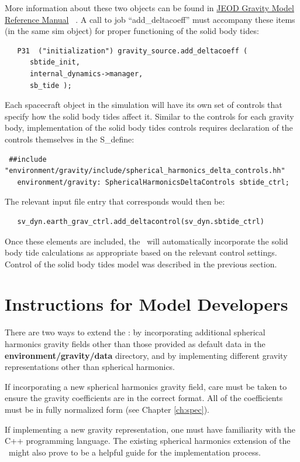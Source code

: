 More information about these two objects can be found in
\hyperref{file:refman.pdf}{}{}
{JEOD Gravity Model Reference Manual} ~\cite{gravity_refman}. A call to job
``add\_deltacoeff'' must accompany these items (in the same sim object) for
proper functioning of the solid body tides:
\begin{verbatim}
   P31  ("initialization") gravity_source.add_deltacoeff (
      sbtide_init,
      internal_dynamics->manager,
      sb_tide );
\end{verbatim}

Each spacecraft object in the simulation will have its own set of controls that
specify how the solid body tides affect it. Similar to the controls for each
gravity body, implementation of the solid body tides controls requires
declaration of the controls themselves in the S\_define:
\begin{verbatim}
 ##include "environment/gravity/include/spherical_harmonics_delta_controls.hh"
   environment/gravity: SphericalHarmonicsDeltaControls sbtide_ctrl;
\end{verbatim}

The relevant input file entry that corresponds would then be:
\begin{verbatim}
   sv_dyn.earth_grav_ctrl.add_deltacontrol(sv_dyn.sbtide_ctrl)
\end{verbatim}

Once these elements are included, the \ModelDesc\ will automatically
incorporate the solid body tide calculations as appropriate based on the
relevant control settings.  Control of the solid body tides model was described
in the previous section.

\section{Instructions for Model Developers}
There are two ways to extend the \ModelDesc: by incorporating additional
spherical harmonics gravity fields other than those provided as default data in
the {\bf environment/gravity/data} directory, and by implementing different
gravity representations other than spherical harmonics.

If incorporating a new spherical harmonics gravity field, care must be taken to
ensure the gravity coefficients are in the correct format.  All of the
coefficients must be in fully normalized form (see Chapter \ref{ch:spec}).

If implementing a new gravity representation, one must have familiarity with
the C++ programming language. The existing spherical harmonics extension of
the \ModelDesc\ might also prove to be a helpful guide for the implementation
process.

